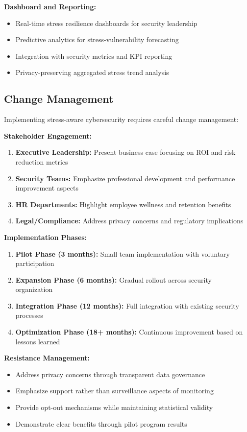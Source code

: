 \documentclass[11pt,a4paper]{article}
\begin{document}
\textbf{Dashboard and Reporting:}
\begin{itemize}
\item Real-time stress resilience dashboards for security leadership
\item Predictive analytics for stress-vulnerability forecasting
\item Integration with security metrics and KPI reporting
\item Privacy-preserving aggregated stress trend analysis
\end{itemize}

\subsection{Change Management}

Implementing stress-aware cybersecurity requires careful change management:

\textbf{Stakeholder Engagement:}
\begin{enumerate}
\item \textbf{Executive Leadership:} Present business case focusing on ROI and risk reduction metrics
\item \textbf{Security Teams:} Emphasize professional development and performance improvement aspects
\item \textbf{HR Departments:} Highlight employee wellness and retention benefits
\item \textbf{Legal/Compliance:} Address privacy concerns and regulatory implications
\end{enumerate}

\textbf{Implementation Phases:}
\begin{enumerate}
\item \textbf{Pilot Phase (3 months):} Small team implementation with voluntary participation
\item \textbf{Expansion Phase (6 months):} Gradual rollout across security organization
\item \textbf{Integration Phase (12 months):} Full integration with existing security processes
\item \textbf{Optimization Phase (18+ months):} Continuous improvement based on lessons learned
\end{enumerate}

\textbf{Resistance Management:}
\begin{itemize}
\item Address privacy concerns through transparent data governance
\item Emphasize support rather than surveillance aspects of monitoring
\item Provide opt-out mechanisms while maintaining statistical validity
\item Demonstrate clear benefits through pilot program results
\end{itemize}
\end{document}
